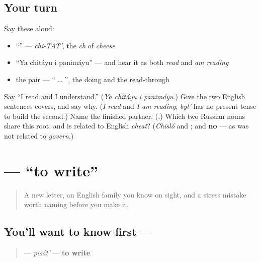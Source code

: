 \subsection*{Your turn}
Say these aloud:

\begin{itemize}
\raggedright
  \item \textquotedblleft{}\textquotedblright{} — \emph{chi-TAT'}, the \emph{ch} of \emph{cheese}
  \item \textquotedblleft{}Ya chitáyu i panimáyu\textquotedblright{} — and hear it as both \emph{read} and \emph{am reading}
  \item the pair — \textquotedblleft{} … \textquotedblright{}, the doing and the read-through
\end{itemize}

\begin{tcolorbox}[breakable,colback=teal!4,colframe=teal!35!black,title={Before you move on}]
Say \textquotedblleft{}I read and I understand.\textquotedblright{} (\emph{Ya chitáyu i panimáyu}.) Give the two English sentences \emph{ } covers, and say why. (\emph{I read} and \emph{I am reading}; \emph{byt'} has no present tense to build the second.) Name the finished partner. (\textbf{}.) Which two Russian nouns share this root, and is \emph{} related to English \emph{cheat}? (\emph{Chisló} and \textbf{}; and \textbf{no} — as \emph{} was not related to \emph{govern}.)
\end{tcolorbox}
\section[\texorpdfstring{\ru{писать} (pisát')}{писать (pisát')}]{ — \textquotedblleft{}to write\textquotedblright{}}

\label{lesson:RU-C04-pisat}



\begin{quote}
A new letter, an English family you know on sight, and a stress mistake worth naming before you make it.
\end{quote}

\subsection*{You'll want to know first — }
\begin{quote}
\textbf{} — \emph{pisát'} — \textbf{to write}
\end{quote}

